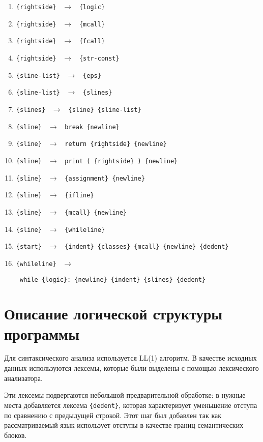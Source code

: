 \documentclass[a4paper,10pt,notitlepage,pdftex]{scrreprt}
\begin{document}
\begin{enumerate}
                \item \verb'{rightside} ' $\rightarrow$ \verb' {logic}'
                \item \verb'{rightside} ' $\rightarrow$ \verb' {mcall}'
                \item \verb'{rightside} ' $\rightarrow$ \verb' {fcall}'
                \item \verb'{rightside} ' $\rightarrow$ \verb' {str-const}'
                \item \verb'{sline-list} ' $\rightarrow$ \verb' {eps}'
                \item \verb'{sline-list} ' $\rightarrow$ \verb' {slines}'
                \item \verb'{slines} ' $\rightarrow$ \verb' {sline} {sline-list}'
                \item \verb'{sline} ' $\rightarrow$ \verb' break {newline}'
                \item \verb'{sline} ' $\rightarrow$ \verb' return {rightside} {newline}'
                \item \verb'{sline} ' $\rightarrow$ \verb' print ( {rightside} ) {newline}'
                \item \verb'{sline} ' $\rightarrow$ \verb' {assignment} {newline}'
                \item \verb'{sline} ' $\rightarrow$ \verb' {ifline}'
                \item \verb'{sline} ' $\rightarrow$ \verb' {mcall} {newline}'
                \item \verb'{sline} ' $\rightarrow$ \verb' {whileline}'
                \item \verb'{start} ' $\rightarrow$ \verb' {indent} {classes} {mcall} {newline} {dedent}'
                \item \verb'{whileline} ' $\rightarrow$

                    \verb' while {logic}: {newline} {indent} {slines} {dedent}'
            \end{enumerate}
\chapter{Описание логической структуры программы}
\label{chap:third}
    Для синтаксического анализа используется LL(1) алгоритм.
    В качестве исходных данных используются лексемы, которые были выделены с помощью лексического анализатора.

    Эти лексемы подвергаются небольшой предварительной обработке: в нужные места добавляется лексема \verb'{dedent}',
    которая характеризует уменьшение отступа по сравнению с предыдущей строкой.
    Этот шаг был добавлен так как рассматриваемый язык использует отступы в качестве границ семантических блоков.
\end{document}
